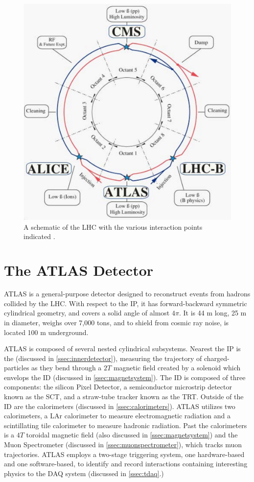 \begin{figure}[!ht]
    \centering
    \includegraphics[width=.7\textwidth]{chapters/chapter2_experiment/images/lhc_interaction_points.png}
    \caption{A schematic of the LHC with the various interaction points indicated \cite{lhc}.}
    \label{fig:lhc}
\end{figure}


\section{The ATLAS Detector}

ATLAS \cite{atlas-experiment} is a general-purpose detector designed to reconstruct events from hadrons collided by the \gls{LHC}. With respect to the \gls{IP}, it has forward-backward symmetric cylindrical geometry, and covers a solid angle of almost $4\pi$. It is 44 m long, 25 m in diameter, weighs over 7,000 tons, and to shield from cosmic ray noise, is located 100 m underground. 

ATLAS is composed of several nested cylindrical subsystems. Nearest the \gls{IP} is the  (discussed in \ref{ssec:innerdetector}), measuring the trajectory of charged-particles as they bend through a $\unit{2}{T}$ magnetic field created by a solenoid which envelops the \gls{ID} (discussed in \ref{ssec:magnetsystem}). The \gls{ID} is composed of three components: the silicon Pixel Detector, a semiconductor microstrip detector known as the \gls{SCT}, and a straw-tube tracker known as the \gls{TRT}. Outside of the \gls{ID} are the calorimeters (discussed in \ref{ssec:calorimeters}). ATLAS utilizes two calorimeters, a \gls{LAr} calorimeter to measure electromagnetic radiation and a scintillating tile calorimeter to measure hadronic radiation. Past the calorimeters is a $\unit{4}{T}$ toroidal magnetic field (also discussed in \ref{ssec:magnetsystem}) and the Muon Spectrometer (discussed in \ref{ssec:muonspectrometer}), which tracks muon trajectories. ATLAS employs a two-stage triggering system, one hardware-based and one software-based, to identify and record interactions containing interesting physics to the \gls{DAQ} system (discussed in \ref{ssec:tdaq}.)

